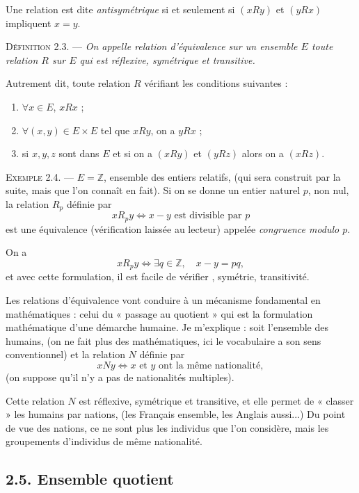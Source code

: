 Une relation est dite \emph{antisymétrique} si et seulement si $(xRy)$ et $(yRx)$ impliquent $x=y$.


\medskip\noindent\textsc{Définition 2.3.} --- \emph{On appelle relation d'équivalence sur un ensemble $E$ toute relation $R$ sur $E$ qui est réflexive, symétrique et transitive.}

Autrement dit, toute relation $R$ vérifiant les conditions suivantes :
\begin{enumerate}[label=\arabic*)]
\item $\forall x\in E$, $xRx$ ;
\item $\forall(x,y)\in E\times E$ tel que $xRy$, on a $yRx$ ;
\item si $x,y,z$ sont dans $E$ et si on a $(xRy)$ et $(yRz)$ alors on a $(xRz)$.
\end{enumerate}

\medskip\noindent\textsc{Exemple 2.4.} --- $E=\mathbb Z$, ensemble des entiers relatifs, (qui sera construit par la suite, mais que l'on connaît en fait). Si on se donne un entier naturel $p$, non nul, la relation $R_p$ définie par
\[
xR_py\Leftrightarrow x-y\text{ est divisible par }p
\]
est une équivalence (vérification laissée au lecteur) appelée \emph{congruence modulo $p$}.

On a
\[
xR_py\Leftrightarrow\exists q\in\mathbb Z,\quad x-y=pq,
\]
et avec cette formulation, il est facile de vérifier , symétrie, transitivité. \bookend

Les relations d'équivalence vont conduire à un mécanisme fondamental en mathématiques : celui du « passage au quotient » qui est la formulation mathématique d'une démarche humaine. Je m'explique : soit l'ensemble des humains, (on ne fait plus des mathématiques, ici le vocabulaire a son sens conventionnel) et la relation $N$ définie par
\[
xNy\Leftrightarrow x\text{ et }y\text{ ont la même nationalité},
\]
(on suppose qu'il n'y a pas de nationalités multiples).

Cette relation $N$ est réflexive, symétrique et transitive, et elle permet de « classer » les humains par nations, (les Français ensemble, les Anglais aussi...) Du point de vue des nations, ce ne sont plus les individus que l'on considère, mais les groupements d'individus de même nationalité.

\subsection*{2.5. Ensemble quotient}

